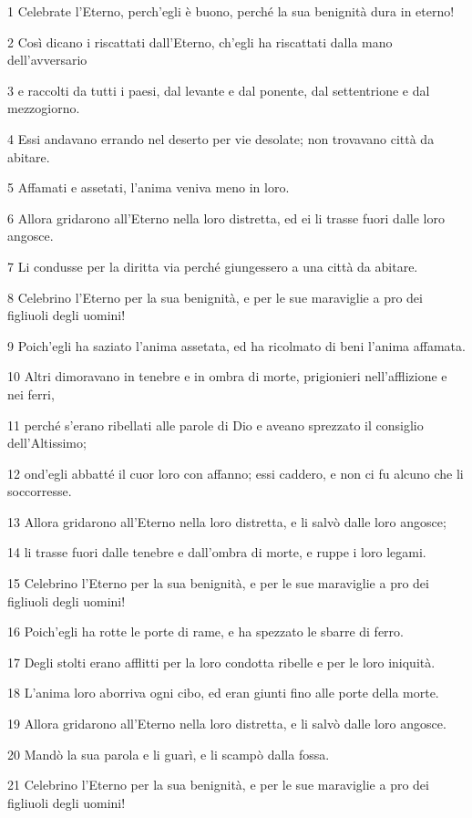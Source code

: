 \par 1 Celebrate l'Eterno, perch'egli è buono, perché la sua benignità dura in eterno!
\par 2 Così dicano i riscattati dall'Eterno, ch'egli ha riscattati dalla mano dell'avversario
\par 3 e raccolti da tutti i paesi, dal levante e dal ponente, dal settentrione e dal mezzogiorno.
\par 4 Essi andavano errando nel deserto per vie desolate; non trovavano città da abitare.
\par 5 Affamati e assetati, l'anima veniva meno in loro.
\par 6 Allora gridarono all'Eterno nella loro distretta, ed ei li trasse fuori dalle loro angosce.
\par 7 Li condusse per la diritta via perché giungessero a una città da abitare.
\par 8 Celebrino l'Eterno per la sua benignità, e per le sue maraviglie a pro dei figliuoli degli uomini!
\par 9 Poich'egli ha saziato l'anima assetata, ed ha ricolmato di beni l'anima affamata.
\par 10 Altri dimoravano in tenebre e in ombra di morte, prigionieri nell'afflizione e nei ferri,
\par 11 perché s'erano ribellati alle parole di Dio e aveano sprezzato il consiglio dell'Altissimo;
\par 12 ond'egli abbatté il cuor loro con affanno; essi caddero, e non ci fu alcuno che li soccorresse.
\par 13 Allora gridarono all'Eterno nella loro distretta, e li salvò dalle loro angosce;
\par 14 li trasse fuori dalle tenebre e dall'ombra di morte, e ruppe i loro legami.
\par 15 Celebrino l'Eterno per la sua benignità, e per le sue maraviglie a pro dei figliuoli degli uomini!
\par 16 Poich'egli ha rotte le porte di rame, e ha spezzato le sbarre di ferro.
\par 17 Degli stolti erano afflitti per la loro condotta ribelle e per le loro iniquità.
\par 18 L'anima loro aborriva ogni cibo, ed eran giunti fino alle porte della morte.
\par 19 Allora gridarono all'Eterno nella loro distretta, e li salvò dalle loro angosce.
\par 20 Mandò la sua parola e li guarì, e li scampò dalla fossa.
\par 21 Celebrino l'Eterno per la sua benignità, e per le sue maraviglie a pro dei figliuoli degli uomini!

